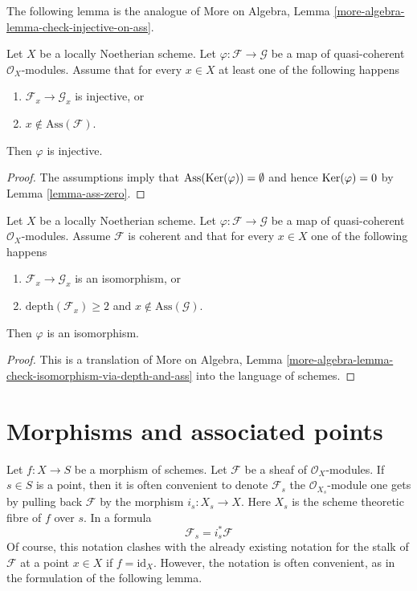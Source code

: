 \noindent
The following lemma is the analogue of
More on Algebra, Lemma \ref{more-algebra-lemma-check-injective-on-ass}.

\begin{lemma}
\label{lemma-check-injective-on-ass}
Let $X$ be a locally Noetherian scheme. Let
$\varphi : \mathcal{F} \to \mathcal{G}$ be a map of
quasi-coherent $\mathcal{O}_X$-modules.
Assume that for every $x \in X$
at least one of the following happens
\begin{enumerate}
\item $\mathcal{F}_x \to \mathcal{G}_x$ is injective, or
\item $x \not \in \text{Ass}(\mathcal{F})$.
\end{enumerate}
Then $\varphi$ is injective.
\end{lemma}

\begin{proof}
The assumptions imply that $\text{Ass}(\mathop{\mathrm{Ker}}(\varphi)) = \emptyset$
and hence $\mathop{\mathrm{Ker}}(\varphi) = 0$ by Lemma \ref{lemma-ass-zero}.
\end{proof}

\begin{lemma}
\label{lemma-check-isomorphism-via-depth-and-ass}
Let $X$ be a locally Noetherian scheme. Let
$\varphi : \mathcal{F} \to \mathcal{G}$ be a map of
quasi-coherent $\mathcal{O}_X$-modules. Assume $\mathcal{F}$ is coherent
and that for every $x \in X$ one of the following happens
\begin{enumerate}
\item $\mathcal{F}_x \to \mathcal{G}_x$ is an isomorphism, or
\item $\text{depth}(\mathcal{F}_x) \geq 2$ and
$x \not \in \text{Ass}(\mathcal{G})$.
\end{enumerate}
Then $\varphi$ is an isomorphism.
\end{lemma}

\begin{proof}
This is a translation of More on Algebra, Lemma
\ref{more-algebra-lemma-check-isomorphism-via-depth-and-ass}
into the language of schemes.
\end{proof}




\section{Morphisms and associated points}
\label{section-morphisms-associated}

\noindent
Let $f : X \to S$ be a morphism of schemes.
Let $\mathcal{F}$ be a sheaf of $\mathcal{O}_X$-modules.
If $s \in S$ is a point, then it is often convenient to
denote $\mathcal{F}_s$ the $\mathcal{O}_{X_s}$-module
one gets by pulling back $\mathcal{F}$ by the morphism
$i_s : X_s \to X$. Here $X_s$ is the scheme theoretic fibre of $f$ over $s$.
In a formula
$$
\mathcal{F}_s = i_s^*\mathcal{F}
$$
Of course, this notation clashes with the already existing notation
for the stalk of $\mathcal{F}$ at a point $x \in X$ if $f = \text{id}_X$.
However, the notation is often convenient, as in the formulation of
the following lemma.

